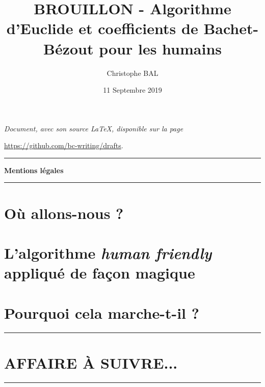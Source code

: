 \documentclass[12pt]{amsart}
\newcommand\myquote[1]{\emph{\og #1 \fg}}
\begin{document}
\title{BROUILLON - Algorithme d'Euclide et coefficients de Bachet-Bézout pour les humains}
\author{Christophe BAL}
\date{11 Septembre 2019}

\maketitle

\begin{center}
    \itshape
    Document, avec son source \LaTeX, disponible sur la page
    
    \url{https://github.com/bc-writing/drafts}.
\end{center}


\bigskip


\begin{center}
    \hrule\vspace{.3em}
    {
        \fontsize{1.35em}{1em}\selectfont
        \textbf{Mentions \og légales \fg}
    }
            
    \vspace{0.45em}
    \doclicenseThis
    \hrule
\end{center}


\setcounter{tocdepth}{2}
\tableofcontents




\newpage

\section{Où allons-nous ?}






\section{L'algorithme \myquote{human friendly} appliqué de façon magique}






\section{Pourquoi cela marche-t-il ?}







%

\bigskip

\hrule

\section{AFFAIRE À SUIVRE...}

\bigskip

\hrule
\end{document}
